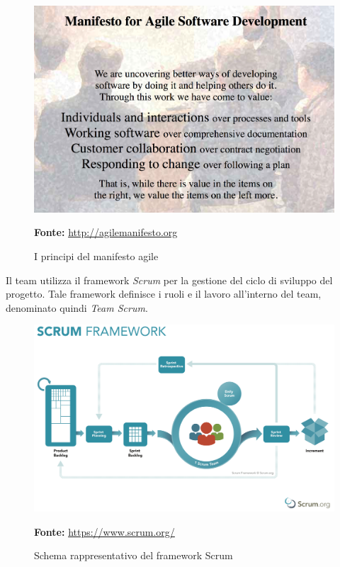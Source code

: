 \begin{figure}[H]
	\begin{center}
	\includegraphics[scale=0.25]{immagini/agile_manifesto.png}
	\caption{I principi del manifesto agile}
	\small{\textbf{Fonte:} \url{http://agilemanifesto.org}}
	\end{center}
\end{figure}

\noindent Il team utilizza il framework \textit{Scrum} per la gestione del ciclo di sviluppo del progetto.
Tale framework definisce i ruoli e il lavoro all'interno del team, denominato quindi \textit{Team Scrum}.\\

\begin{figure}[H]
	\begin{center}
	\includegraphics[scale=0.3]{immagini/scrum.png}
	\caption{Schema rappresentativo del framework Scrum}
	\small{\textbf{Fonte:} \url{https://www.scrum.org/}}
	\end{center}
\end{figure}

